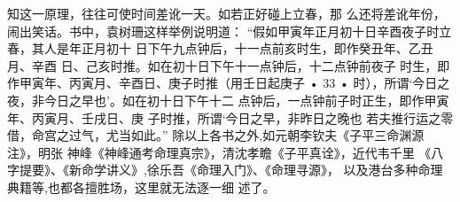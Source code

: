 知这一原理，往往可使时间差讹一天。如若正好碰上立春，那
么还将差讹年份，闹出笑话。书中，袁树珊这样举例说明道：
“假如甲寅年正月初十日辛酉夜子时立春，其人是年正月初十
日下午九点钟后，十一点前亥时生，即作癸丑年、乙丑月、辛酉
日、己亥时推。如在初十日下午十一点钟后，十二点钟前夜子
时生，即作甲寅年、丙寅月、辛酉日、庚子时推（用壬日起庚子
• 33 •
时），所谓‘今日之夜，非今日之早也'。如在初十日下午十二
点钟后，一点钟前子时正生，即作甲寅年、丙寅月、壬戌日、庚
子时推，所谓‘今日之早，非昨日之晚也 若夫推行运之零
借，命宫之过气，尤当如此。”
除以上各书之外,如元朝李钦夫《子平三命渊源注》，明张
神峰《神峰通考命理真宗》，清沈孝瞻《子平真诠》，近代韦千里
《八字提要》、《新命学讲义》,徐乐吾《命理入门》、《命理寻源》，
以及港台多种命理典籍等,也都各擅胜场，这里就无法逐一细
述了。